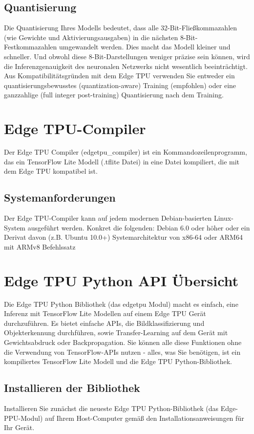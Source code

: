 \subsection{Quantisierung}
Die Quantisierung Ihres Modells bedeutet, dass alle 32-Bit-Fließkommazahlen (wie Gewichte und Aktivierungsausgaben) in die nächsten 8-Bit-Festkommazahlen umgewandelt werden. Dies macht das Modell kleiner und schneller. Und obwohl diese 8-Bit-Darstellungen weniger präzise sein können, wird die Inferenzgenauigkeit des neuronalen Netzwerks nicht wesentlich beeinträchtigt.
Aus Kompatibilitätsgründen mit dem Edge TPU verwenden Sie entweder ein quantisierungsbewusstes (quantization-aware) Training (empfohlen) oder eine ganzzahlige
(full integer post-training) Quantisierung nach dem Training.

\section{Edge TPU-Compiler}
Der Edge TPU Compiler (edgetpu\_compiler) ist ein Kommandozeilenprogramm, das ein TensorFlow Lite Modell (.tflite Datei) in eine Datei kompiliert, die mit dem Edge TPU kompatibel ist. 

\subsection{Systemanforderungen}
Der Edge TPU-Compiler kann auf jedem modernen Debian-basierten Linux-System ausgeführt werden. Konkret die folgenden:
Debian 6.0 oder höher oder ein Derivat davon (z.B. Ubuntu 10.0+)
Systemarchitektur von x86-64 oder ARM64 mit ARMv8 Befehlssatz

\section{Edge TPU Python API Übersicht}
Die Edge TPU Python Bibliothek (das edgetpu Modul) macht es einfach, eine Inferenz mit TensorFlow Lite Modellen auf einem Edge TPU Gerät durchzuführen. Es bietet einfache APIs, die Bildklassifizierung und Objekterkennung durchführen, sowie Transfer-Learning auf dem Gerät mit Gewichtsabdruck oder Backpropagation. Sie können alle diese Funktionen ohne die Verwendung von TensorFlow-APIs nutzen - alles, was Sie benötigen, ist ein kompiliertes TensorFlow Lite Modell und die Edge TPU Python-Bibliothek.

\subsection{Installieren der Bibliothek}
Installieren Sie zunächst die neueste Edge TPU Python-Bibliothek (das Edge-PPU-Modul) auf Ihrem Host-Computer gemäß den Installationsanweisungen für Ihr Gerät.

